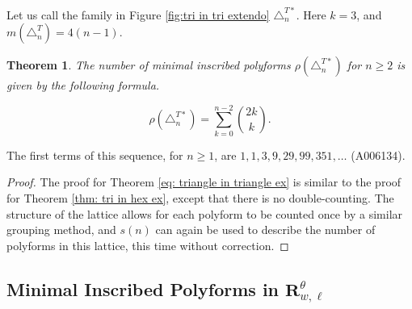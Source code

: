\documentclass[12pt]{article}
\newtheorem{theorem}{Theorem}
\theoremstyle{plain}
\theoremstyle{definition}
\theoremstyle{remark}
\theoremstyle{definition}
\begin{document}
Let us call the family in Figure \ref{fig:tri in tri extendo} $\triangle^{T*}_n$. Here $k=3$, and $m(\triangle^T_n) = 4(n-1)$. 

\begin{theorem}\label{thm: tri in tri ex}
The number of minimal inscribed polyforms $\rho(\triangle^{T*}_n)$ for $n \geq 2$ is given by the following formula.

\begin{equation}\label{eq: triangle in triangle ex}
    \rho(\triangle^{T*}_n) = \sum_{k=0}^{n-2} \binom{2k}{k}.
\end{equation}
\end{theorem}

\noindent The first terms of this sequence, for $n \geq 1$, are $1, 1, 3, 9, 29, 99, 351, \dots$ (A006134).

\begin{proof}
    The proof for Theorem \ref{eq: triangle in triangle ex} is similar to the proof for Theorem \ref{thm: tri in hex ex}, except that there is no double-counting. The structure of the lattice allows for each polyform to be counted once by a similar grouping method, and $s(n)$ can again be used to describe the number of polyforms in this lattice, this time without correction.
\end{proof}

\subsection{Minimal Inscribed Polyforms in \texorpdfstring{$\mathbf{R}^{\theta}_{w,\ell}$}{thetan}}
\end{document}
